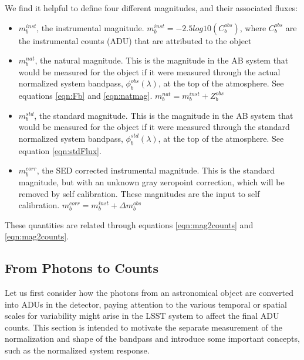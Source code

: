 \documentclass[12pt,preprint]{aastex}
\begin{document}
\begin{boxedminipage}{7in}
We find it helpful to define four different magnitudes, and their associated fluxes:
\begin{itemize}
\item{$m_b^{inst}$, the instrumental magnitude.  $m_b^{inst} = -2.5 log10(C_b^{obs})$, where $C_b^{obs}$ are the instrumental counts (ADU) that are attributed to the object}
\item{$m_b^{nat}$, the natural magnitude.  This is the magnitude in the AB system that would be measured for the object if it were measured through the actual normalized system bandpass, $\phi_b^{obs}(\lambda)$, at the top of the atmosphere.  See equations \ref{eqn:Fb} and \ref{eqn:natmag}. $m_b^{nat} = m_b^{inst} + Z_b^{obs}$}
\item{$m_b^{std}$}, the standard magnitude.  This is the magnitude in the AB system that would be measured for the object if it were measured through the standard normalized system bandpass, $\phi_b^{std}(\lambda)$, at the top of the atmosphere.  See equation \ref{eqn:stdFlux}. 
\item{$m_b^{corr}$, the SED corrected instrumental magnitude.  This is the standard magnitude, but with an unknown gray zeropoint correction, which will be removed by self calibration.  These magnitudes are the input to self calibration. $m_b^{corr} = m_b^{inst} + \Delta m_b^{obs}$}
\end{itemize}
These quantities are related through equations \ref{eqn:mag2counts} and \ref{eqn:mag2counts}.
\end{boxedminipage}

\subsection{From Photons to Counts}

Let us first consider how the photons from an astronomical object are
converted into ADUs in the detector, paying attention to the various
temporal or spatial scales for variability might arise in the LSST
system to affect the final ADU counts. This section is intended
to motivate the separate measurement of the normalization and shape of
the bandpass and introduce some important concepts, such as the
normalized system response.
\end{document}
